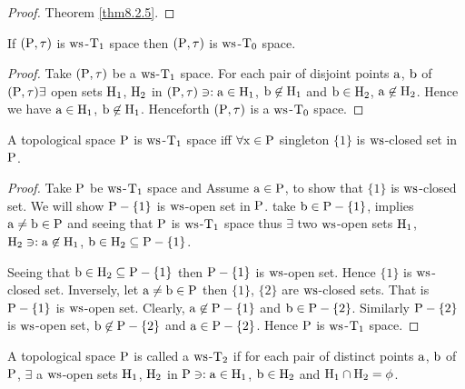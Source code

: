 \begin{proof}
Theorem \ref{thm8.2.5}.
\end{proof}

\begin{thm}\label{thm8.2.12}
If $(\mathrm{P}, \tau)$ is $\mathrm{ws}$-$\mathrm{T}_{1}$ space then $(\mathrm{P}, \tau)$ is $\mathrm{ws}$-$\mathrm{T}_{0}$ space.
\end{thm}

\begin{proof}
Take $(\mathrm{P}, \tau)$ be a $\mathrm{ws}$-$\mathrm{T}_{1}$ space. For each pair of disjoint points $\mathrm{a}$, $\mathrm{b}$ of $(\mathrm{P}, \tau) \exists$ open sets $\mathrm{H}_{1}$, $\mathrm{H}_{2}$ in $(\mathrm{P}, \tau) \ni: \mathrm{a} \in \mathrm{H}_{1}$, $\mathrm{b} \not\in \mathrm{H}_{1}$ and $\mathrm{b} \in \mathrm{H}_{2}$, $\mathrm{a} \not\in \mathrm{H}_{2}$. Hence we have $\mathrm{a} \in \mathrm{H}_{1}$, $\mathrm{b} \not\in \mathrm{H}_{1}$. Henceforth $(\mathrm{P}, \tau)$ is a $\mathrm{ws}$-$\mathrm{T}_{0}$ space.
\end{proof}

\begin{thm}\label{thm8.2.13}
A topological space $\mathrm{P}$ is $\mathrm{ws}$-$\mathrm{T}_{1}$ space iff $\forall \mathrm{x}\in \mathrm{P}$ singleton $\{1\}$ is $\mathrm{ws}$-closed set in $\mathrm{P}$.
\end{thm}

\begin{proof}
Take $\mathrm{P}$ be $\mathrm{ws}$-$\mathrm{T}_{1}$ space and Assume $\mathrm{a} \in \mathrm{P}$, to show that $\{1\}$ is $\mathrm{ws}$-closed set. We will show $\mathrm{P}-\{1\}$ is $\mathrm{ws}$-open set in $\mathrm{P}$. take $\mathrm{b} \in \mathrm{P}-\{1\}$, implies $\mathrm{a} \neq \mathrm{b} \in \mathrm{P}$ and seeing that $\mathrm{P}$ is $\mathrm{ws}$-$\mathrm{T}_{1}$ space thus $\exists$ two $\mathrm{ws}$-open sets $\mathrm{H}_{1}$, $\mathrm{H}_{2} \ni: \mathrm{a} \not\in \mathrm{H}_{1}$, $\mathrm{b} \in \mathrm{H}_{2} \subseteq \mathrm{P}-\{1\}$.

Seeing that $\mathrm{b}\in \mathrm{H}_{2} \subseteq \mathrm{P}-\{1\}$ then $\mathrm{P}-\{1\}$ is $\mathrm{ws}$-open set. Hence $\{1\}$ is $\mathrm{ws}$-closed set. Inversely, let $\mathrm{a} \neq \mathrm{b} \in \mathrm{P}$ then $\{1\}$, $\{2\}$ are $\mathrm{ws}$-closed sets. That is $\mathrm{P}-\{1\}$ is $\mathrm{ws}$-open set. Clearly, $\mathrm{a} \not\in \mathrm{P}-\{1\}$ and $\mathrm{b} \in \mathrm{P}-\{2\}$. Similarly $\mathrm{P}-\{2\}$ is $\mathrm{ws}$-open set, $\mathrm{b} \not\in \mathrm{P}-\{2\}$ and $\mathrm{a} \in \mathrm{P}-\{2\}$. Hence $\mathrm{P}$ is $\mathrm{ws}$-$\mathrm{T}_{1}$ space.
\end{proof}

\begin{dfn}\label{defi8.2.14}
A topological space $\mathrm{P}$ is called a $\mathrm{ws}$-$\mathrm{T}_{2}$ if for each pair of distinct points $\mathrm{a}$, $\mathrm{b}$ of $\mathrm{P}$, $\exists$ a $\mathrm{ws}$-open sets $\mathrm{H}_{1}$, $\mathrm{H}_{2}$ in $\mathrm{P} \ni: \mathrm{a} \in \mathrm{H}_{1}$, $\mathrm{b} \in \mathrm{H}_{2}$ and $\mathrm{H}_{1} \cap \mathrm{H}_{2} = \phi$.
\end{dfn}

